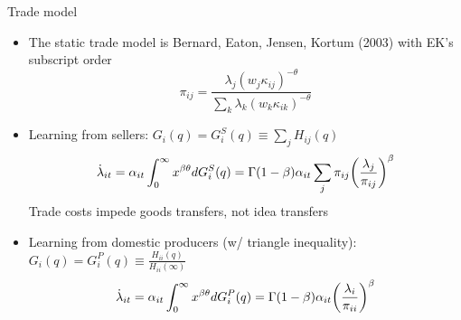 \documentclass[10pt,notes=hide]{beamer}
\begin{document}
\begin{frame}{Trade model}
\begin{itemize}
\item The static trade model is Bernard, Eaton, Jensen, Kortum (2003) with EK's subscript order
$$\pi_{ij} = \frac{\lambda_{j} \left(w_j \kappa_{ij}\right)^{-\theta}}{\sum_{k}\lambda_{k} \left(w_k \kappa_{ik}\right)^{-\theta}}$$
\item Learning from sellers: $G_i(q) = G_i^{S}(q) \equiv \sum_{j} H_{ij} (q)$
\begin{equation*}
\dot \lambda_{it}
=  \alpha_{it}  \int_0^\infty x^{\beta\theta} d G_i^S(q)
= \Gamma(1-\beta) \alpha_{it} \sum_j \pi_{ij} \bigg( {\lambda_j \over \pi_{ij} } \bigg)^\beta
\end{equation*}
Trade costs impede goods transfers, not idea transfers
\item Learning from domestic producers (w/ triangle inequality):
$G_i(q) = G_i^{P}(q) \equiv \frac{H_{ii}(q)}{H_{ii}(\infty)}$
\begin{equation*}
\dot \lambda_{it} 
=  \alpha_{it}  \int_0^\infty x^{\beta\theta} d G_i^P(q)
= \Gamma(1-\beta) \alpha_{it} \bigg( { \lambda_i \over \pi_{ii} } \bigg)^\beta
\end{equation*}
\end{itemize}
\end{frame}
\end{document}
